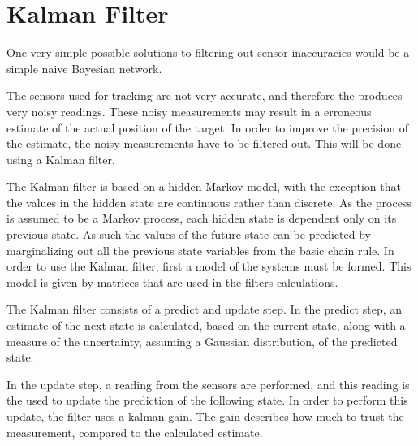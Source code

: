 \section{Kalman Filter}


One very simple possible solutions to filtering out sensor inaccuracies would be a simple naive Bayesian network. 




The sensors used for tracking are not very accurate, and therefore the produces very noisy readings. These noisy measurements may result in a erroneous estimate of the actual position of the target. In order to improve the precision of the estimate, the noisy measurements have to be filtered out. This will be done using a Kalman filter.


The Kalman filter is based on a hidden Markov model, with the exception that the values in the hidden state are continuous rather than discrete. As the process is assumed to be a Markov process, each hidden state is dependent only on its previous state. As such the values of the future state can be predicted by marginalizing out all the previous state variables from the basic chain rule. In order to use the Kalman filter, first a model of the systems must be formed. This model is given by matrices that are used in the filters calculations.

The Kalman filter consists of a predict and update step. In the predict step, an estimate of the next state is calculated, based on the current state, along with a measure of the uncertainty, assuming a Gaussian distribution, of the predicted state.

In the update step, a reading from the sensors are performed, and this reading is the used to update the prediction of the following state. In order to perform this update, the filter uses a kalman gain. The gain describes how much to trust the measurement, compared to the calculated estimate.